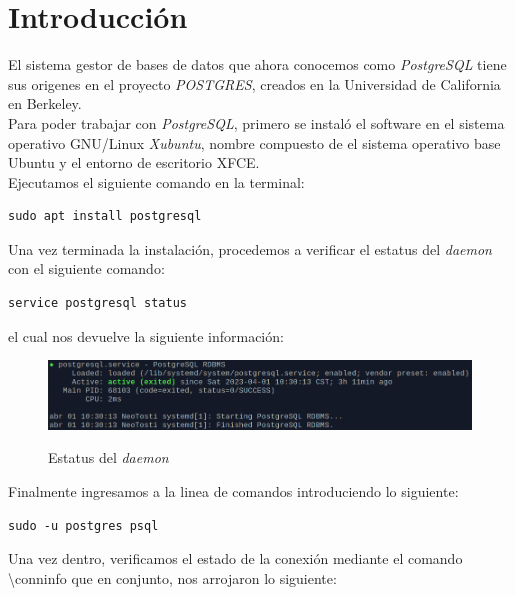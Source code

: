 \documentclass[a4paper,12pt]{article}
\begin{document}
\section{Introducción}

El sistema gestor de bases de datos que ahora conocemos como \emph{PostgreSQL} tiene sus origenes en el proyecto \emph{POSTGRES}, creados en la Universidad de California en Berkeley.\\

Para poder trabajar con \emph{PostgreSQL}, primero se instaló el software en el sistema operativo GNU/Linux \emph{Xubuntu}, nombre compuesto de el sistema operativo base Ubuntu y el entorno de escritorio XFCE.\\

Ejecutamos el siguiente comando en la terminal:\\

\begin{lstlisting}
sudo apt install postgresql
\end{lstlisting}


Una vez terminada la instalación, procedemos a verificar el estatus del \emph{daemon} con el siguiente comando:\\

\begin{lstlisting}
service postgresql status
\end{lstlisting}

el cual nos devuelve la siguiente información:\\

\vspace{.5cm}

\begin{figure}[!h]
\centering
	\includegraphics[width=.7\textwidth]{fig1}
	\label{fig1}
	 \caption{Estatus del \emph{daemon}}
\end{figure}


\vspace{.5cm}

Finalmente ingresamos a la linea de comandos introduciendo lo siguiente:

\begin{lstlisting}
sudo -u postgres psql
\end{lstlisting}


Una vez dentro, verificamos el estado de la conexión mediante el comando \textbackslash conninfo que en conjunto, nos arrojaron lo siguiente:\\
\end{document}
